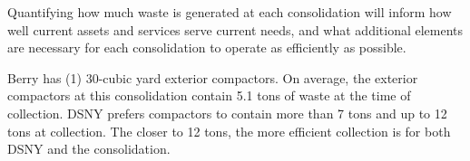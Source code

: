 
    Quantifying how much waste is generated at each consolidation will inform how well current assets and services serve current needs, and what additional elements are necessary for each consolidation to operate as efficiently as possible.
    
    Berry has (1) 30-cubic yard exterior compactors. On average, the exterior compactors at this consolidation contain 5.1 tons of waste at the time of collection. DSNY prefers compactors to contain more than 7 tons and up to 12 tons at collection. The closer to 12 tons, the more efficient collection is for both DSNY and the consolidation.